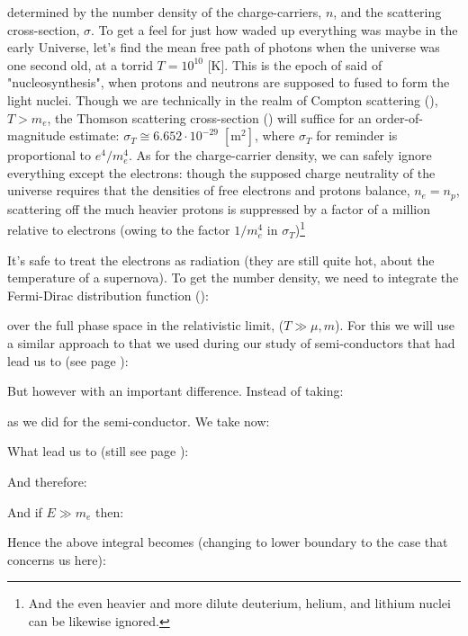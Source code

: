 	determined by the number density of the charge-carriers, $n$, and the scattering cross-section, $\sigma$. To get a feel for just how waded up everything was maybe in the early Universe, let's find the mean free path of photons when the universe was one second old, at a torrid $T=10^{10}$ [K]. This is the epoch of said of "nucleosynthesis", when protons and neutrons are supposed to fused to form the light nuclei. Though we are technically in the realm of Compton scattering (), $T>m_e$, the Thomson scattering cross-section () will suffice for an order-of-magnitude estimate: $\sigma_T\cong 6.652\cdot 10^{-29}\;[\text{m}^2]$, where $\sigma_T$ for reminder is proportional to $e^4/m_e^4$. As for the charge-carrier density, we can safely ignore everything except the electrons: though the supposed charge neutrality of the universe requires that the densities of free electrons and protons balance, $n_e=n_p$, scattering off the much heavier protons is suppressed by a factor of a million relative to electrons (owing to the factor $1/m_e^4$ in $\sigma_T$)\footnote{And the even heavier and more dilute deuterium, helium, and lithium nuclei can be likewise ignored.}
	
	It's safe to treat the electrons as radiation (they are still quite hot, about the temperature of a supernova). To get the number density, we need to integrate the Fermi-Dirac distribution function ():
	
	over the full phase space in the relativistic limit, ($T\gg \mu,m$). For this we will use a similar approach to that we used during our study of semi-conductors that had lead us to (see page \pageref{non degenerated statistic density of negative electric charge carriers}):
	
	But however with an important difference. Instead of taking:
	
	as we did for the semi-conductor. We take now:
	
	What lead us to (still see page \pageref{non degenerated statistic density of negative electric charge carriers}):
	
	And therefore:
	
	And if $E\gg m_e$ then:
	
	Hence the above integral becomes (changing to lower boundary to the case that concerns us here):
	
